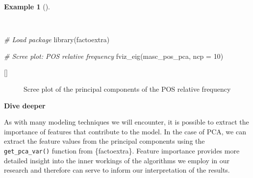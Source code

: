 \documentclass[
  letterpaper,
  krantz1]{latex/krantz-mod}
\newenvironment{Shaded}{\begin{snugshade}}{\end{snugshade}}
\newcommand{\AttributeTok}[1]{\textcolor[rgb]{0.00,0.00,0.00}{#1}}
\newcommand{\CommentTok}[1]{\textcolor[rgb]{0.00,0.00,0.00}{\textit{#1}}}
\newcommand{\DecValTok}[1]{\textcolor[rgb]{0.00,0.00,0.00}{#1}}
\newcommand{\FunctionTok}[1]{\textcolor[rgb]{0.00,0.00,0.00}{#1}}
\newcommand{\NormalTok}[1]{\textcolor[rgb]{0.00,0.00,0.00}{#1}}
\newcommand{\cindex}[1]{%
  \StrSubstitute{#1}{_}{\_}[\temp]%
  \index{\temp}%
}
\theoremstyle{definition}
\theoremstyle{definition}
\newtheorem{example}{Example}[chapter]
\theoremstyle{remark}
\begin{document}
\begin{example}[]\protect\hypertarget{exm-explore-masc-dtms-pca-scree}{}\label{exm-explore-masc-dtms-pca-scree}

~

\begin{Shaded}
\begin{Highlighting}[numbers=left,,]
\CommentTok{\# Load package}
\FunctionTok{library}\NormalTok{(factoextra)}

\CommentTok{\# Scree plot: POS relative frequency}
\FunctionTok{fviz\_eig}\NormalTok{(masc\_pos\_pca, }\AttributeTok{ncp =} \DecValTok{10}\NormalTok{)}
\end{Highlighting}
\end{Shaded}

 \cindex{fviz_eig()}

\begin{figure}[!htb]


\caption{\label{fig-explore-masc-dtms-pca-scree}Scree plot of the
principal components of the POS relative frequency}

\end{figure}%

\end{example}

\begin{tcolorbox}[enhanced jigsaw, toprule=.15mm, breakable, colback=white, arc=.35mm, left=2mm, colframe=quarto-callout-color-frame, opacityback=0, bottomrule=.15mm, rightrule=.15mm, leftrule=.75mm]

\textbf{ Dive deeper}

As with many modeling techniques we will encounter, it is possible to
extract the importance of features that contribute to the
model. In the case of PCA, we can extract the
feature values from the principal components using the
\texttt{get\_pca\_var()} function from \{factoextra\}. Feature
importance provides more detailed insight into the inner workings of the
algorithms we employ in our research and therefore can serve to inform
our interpretation of the results.

\end{tcolorbox}
\end{document}
